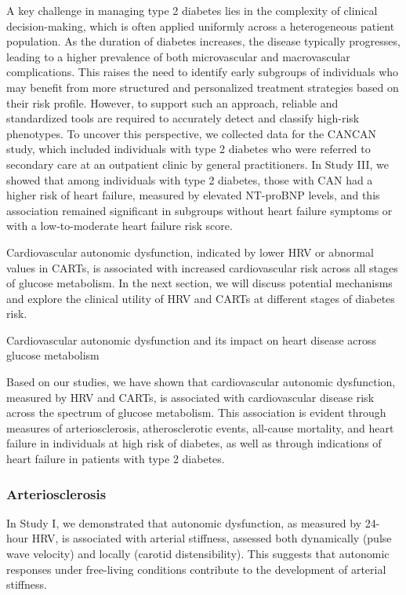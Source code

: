 \documentclass[
  a4paper,
  headsepline=true,
  open=any]{scrbook}
\begin{document}
A key challenge in managing type 2 diabetes lies in the complexity of
clinical decision-making, which is often applied uniformly across a
heterogeneous patient population. As the duration of diabetes increases,
the disease typically progresses, leading to a higher prevalence of both
microvascular and macrovascular complications. This raises the need to
identify early subgroups of individuals who may benefit from more
structured and personalized treatment strategies based on their risk
profile. However, to support such an approach, reliable and standardized
tools are required to accurately detect and classify high-risk
phenotypes. To uncover this perspective, we collected data for the
CANCAN study, which included individuals with type 2 diabetes who were
referred to secondary care at an outpatient clinic by general
practitioners. In Study III, we showed that among individuals with type
2 diabetes, those with CAN had a higher risk of heart failure, measured
by elevated NT-proBNP levels, and this association remained significant
in subgroups without heart failure symptoms or with a low-to-moderate
heart failure risk score.

Cardiovascular autonomic dysfunction, indicated by lower HRV or abnormal
values in CARTs, is associated with increased cardiovascular risk across
all stages of glucose metabolism. In the next section, we will discuss
potential mechanisms and explore the clinical utility of HRV and CARTs
at different stages of diabetes risk.

Cardiovascular autonomic dysfunction and its impact on heart disease
across glucose metabolism

Based on our studies, we have shown that cardiovascular autonomic
dysfunction, measured by HRV and CARTs, is associated with
cardiovascular disease risk across the spectrum of glucose metabolism.
This association is evident through measures of arteriosclerosis,
atherosclerotic events, all-cause mortality, and heart failure in
individuals at high risk of diabetes, as well as through indications of
heart failure in patients with type 2 diabetes.

\hypertarget{arteriosclerosis-1}{%
\subsubsection{Arteriosclerosis}\label{arteriosclerosis-1}}

In Study I, we demonstrated that autonomic dysfunction, as measured by
24-hour HRV, is associated with arterial stiffness, assessed both
dynamically (pulse wave velocity) and locally (carotid distensibility).
This suggests that autonomic responses under free-living conditions
contribute to the development of arterial stiffness.
\end{document}
